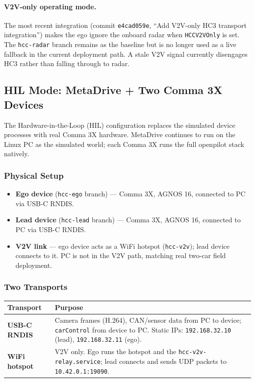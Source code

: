 \documentclass[12pt]{article}
\begin{document}
\paragraph{V2V-only operating mode.} The most recent integration (commit \texttt{e4cad059e}, ``Add V2V-only HC3 transport integration'') makes the ego ignore the onboard radar when \texttt{HCCV2VOnly} is set. The \texttt{hcc-radar} branch remains as the baseline but is no longer used as a live fallback in the current deployment path. A stale V2V signal currently disengages HC3 rather than falling through to radar.

\subsection{HIL Mode: MetaDrive + Two Comma 3X Devices}

The Hardware-in-the-Loop (HIL) configuration replaces the simulated device processes with real Comma 3X hardware. MetaDrive continues to run on the Linux PC as the simulated world; each Comma 3X runs the full openpilot stack natively.

\subsubsection{Physical Setup}

\begin{itemize}
  \item \textbf{Ego device} (\texttt{hcc-ego} branch) --- Comma 3X, AGNOS 16, connected to PC via USB-C RNDIS.
  \item \textbf{Lead device} (\texttt{hcc-lead} branch) --- Comma 3X, AGNOS 16, connected to PC via USB-C RNDIS.
  \item \textbf{V2V link} --- ego device acts as a WiFi hotspot (\texttt{hcc-v2v}); lead device connects to it. PC is not in the V2V path, matching real two-car field deployment.
\end{itemize}

\subsubsection{Two Transports}

\begin{center}
\begin{tabular}{>{\bfseries}p{3.5cm} p{8.5cm}}
  \toprule
  Transport & Purpose \\
  \midrule
  USB-C RNDIS & Camera frames (H.264), CAN/sensor data from PC to device; \texttt{carControl} from device to PC. Static IPs: \texttt{192.168.32.10} (lead), \texttt{192.168.32.11} (ego). \\
  WiFi hotspot & V2V only. Ego runs the hotspot and the \texttt{hcc-v2v-relay.service}; lead connects and sends UDP packets to \texttt{10.42.0.1:19090}. \\
  \bottomrule
\end{tabular}
\end{center}
\end{document}
